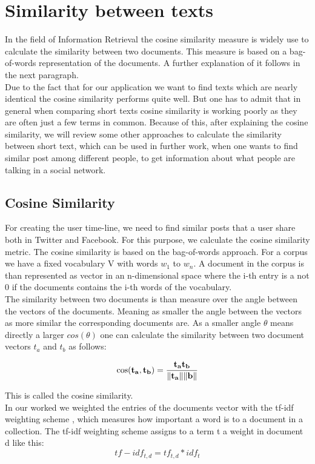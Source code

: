 \section{Similarity between  texts}

In the field of Information Retrieval the cosine similarity measure is widely use to calculate the similarity between two documents. This measure is based on a bag-of-words representation of the documents. A further explanation of it follows in the next paragraph. \\
Due to the fact that for our application we want to find texts which are nearly identical the cosine similarity performs quite well. But one has to admit that in general when comparing short texts cosine similarity is working poorly as they are often just a few terms in common. Because of this, after explaining the cosine similarity, we will review some other approaches to calculate the similarity between short text, which can be used in further work, when one wants to find similar post among different people, to get information about what people are talking in a social network. 

\subsection{Cosine Similarity}

For creating the user time-line, we need to find similar posts that a user share both in Twitter and Facebook. For this purpose, we calculate the cosine similarity metric. The cosine similarity is based on the bag-of-words approach. For a corpus we have a fixed vocabulary V with words $w_1$ to $w_n$. A document in the corpus is than represented as vector in an n-dimensional space where the i-th entry is a not 0 if the documents contains the i-th words of the vocabulary. \\
The similarity between two documents is than measure over the angle between the vectors of the documents. Meaning as smaller the angle between the vectors as more similar the corresponding documents are. As a smaller angle $\theta$ means directly a larger $cos(\theta)$ one can calculate the similarity between two document vectors  $t_{a}$ and $t_{b}$ as follows:

\begin{equation}
\cos ({\bf t_{a}},{\bf t_{b}})= {{\bf t_{a}} {\bf t_{b}} \over \|{\bf t_{a}}\| \|{\bf \textbf{b}}\|} 
\end{equation}

This is called the cosine similarity. \\
In our worked we weighted the entries of the documents vector with the tf-idf weighting scheme  , which measures  how important  a word is to a document in a collection. The tf-idf weighting scheme assigns to a term t a weight in document d like  this:
\begin{equation}
tf-idf_{t,d} = tf_{t,d} * idf_{t} 
\end{equation}

